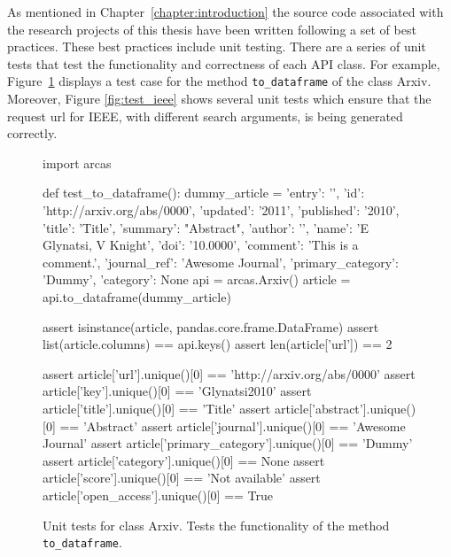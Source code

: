 As mentioned in Chapter~\ref{chapter:introduction} the source code associated
with the research projects of this thesis have been written following a set of
best practices. These best practices include unit testing. There are a series of
unit tests that test the functionality and correctness of each API class.
For example, Figure~\ref{fig:test_arxiv} displays a test case for the
method \texttt{to_dataframe} of the class Arxiv. Moreover, Figure
\ref{fig:test_ieee} shows several unit tests which ensure that the request
url for IEEE, with different search arguments, is being generated correctly.

\begin{figure}[!hbtp]
    \begin{sourcepy}
import arcas

def test_to_dataframe():
    dummy_article = {'entry': '\n', 'id': 'http://arxiv.org/abs/0000',
                     'updated': '2011', 'published': '2010', 'title': 'Title',
                     'summary': "Abstract", 'author': '\n', 'name': 'E Glynatsi, V Knight',
                     'doi': '10.0000', 'comment': 'This is a comment.',
                     'journal_ref': 'Awesome Journal', 'primary_category': 'Dummy',
                     'category': None}
    api = arcas.Arxiv()
    article = api.to_dataframe(dummy_article)

    assert isinstance(article, pandas.core.frame.DataFrame)
    assert list(article.columns) == api.keys()
    assert len(article['url']) == 2

    assert article['url'].unique()[0] == 'http://arxiv.org/abs/0000'
    assert article['key'].unique()[0] == 'Glynatsi2010'
    assert article['title'].unique()[0] == 'Title'
    assert article['abstract'].unique()[0] == 'Abstract'
    assert article['journal'].unique()[0] == 'Awesome Journal'
    assert article['primary_category'].unique()[0] == 'Dummy'
    assert article['category'].unique()[0] == None
    assert article['score'].unique()[0] == 'Not available'
    assert article['open_access'].unique()[0] == True
\end{sourcepy}
\caption{Unit tests for class Arxiv. Tests the functionality of the method \texttt{to_dataframe}.}\label{fig:test_arxiv}
\end{figure}

